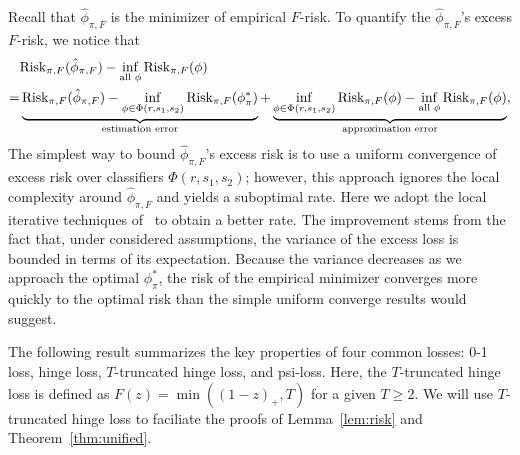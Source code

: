 \documentclass[11pt]{article}
\newcommand*{\KeepStyleUnderBrace}[1]{%
\mathop{%
\mathchoice
{\underbrace{\displaystyle#1}}%
{\underbrace{\textstyle#1}}%
{\underbrace{\scriptstyle#1}}%
{\underbrace{\scriptscriptstyle#1}}%
}\limits
}
\theoremstyle{plain}
\theoremstyle{definition}
\def\riskF{\textup{Risk}_{\pi,F}}
\begin{document}
Recall that $\hat \phi_{\pi,F}$ is the minimizer of empirical $F$-risk.  To quantify the $\hat \phi_{\pi,F}$'s excess $F$-risk, we notice that 
\begin{align}
&\riskF(\hat \phi_{\pi,F})-\inf_{\text{all }{\phi}}\riskF(\phi)\\
=&
 \KeepStyleUnderBrace{\riskF(\hat \phi_{\pi,F})-\inf_{\phi\in\Phi(r,s_1,s_2)}\riskF(\phi_\pi^*)}_{\text{estimation error}}+\KeepStyleUnderBrace{
 \inf_{\phi\in\Phi(r,s_1,s_2)}\riskF(\phi)-\inf_{\text{all }\phi}\riskF(\phi)}_{\text{approximation error}},
 \end{align}
The simplest way to bound $\hat \phi_{\pi,F}$'s excess risk is to use a uniform convergence of excess risk over classifiers $\Phi(r,s_1,s_2)$; however, this approach ignores the local complexity around $\hat \phi_{\pi,F}$ and yields a suboptimal rate. Here we adopt the local iterative techniques of~\citet[Theorem 3]{wang2008probability} to obtain a better rate. The improvement stems from the fact that, under considered assumptions, the variance of the excess loss is bounded in terms of its expectation. Because the variance decreases as we approach the optimal $\phi^*_{\pi}$, the risk of the empirical minimizer converges more quickly to the optimal risk than the simple uniform converge results would suggest. 

The following result summarizes the key properties of four common losses: 0-1 loss, hinge loss, $T$-truncated hinge loss, and psi-loss. Here, the $T$-truncated hinge loss is defined as $F(z)=\min((1-z)_{+},T)$ for a given $T\geq 2$. We will use $T$-truncated hinge loss to faciliate the proofs of Lemma~\ref{lem:risk} and Theorem~\ref{thm:unified}. 
\end{document}
